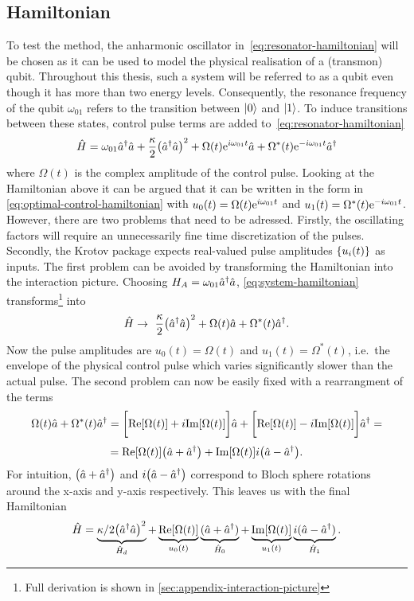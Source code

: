 \documentclass[main.tex]{subfiles}
\begin{document}
\subsection{Hamiltonian}
To test the method, the anharmonic oscillator in~\cref{eq:resonator-hamiltonian} will be chosen as it can be used to model the physical realisation of a (transmon) qubit.
Throughout this thesis, such a system will be referred to as a qubit even though it has more than two energy levels.
Consequently, the resonance frequency of the qubit \( \omega_{01} \) refers to the transition between \( \ket{0} \) and \( \ket{1} \).
To induce transitions between these states, control pulse terms are added to~\cref{eq:resonator-hamiltonian}
\begin{equation}
    \hat{H} = \omega_{01} \hat{a}^\dagger\hat{a} + \frac{\kappa}{2} \qty(\hat{a}^\dagger\hat{a})^2 + \Omega(t)\mathrm{e}^{i\omega_{01}t}\hat{a} + \Omega^*(t)\mathrm{e}^{-i\omega_{01}t}\hat{a}^\dagger
    \label{eq:system-hamiltonian}
\end{equation}
where \( \Omega(t) \) is the complex amplitude of the control pulse.
Looking at the Hamiltonian above it can be argued that it can be written in the form in \cref{eq:optimal-control-hamiltonian} with \( u_0(t) = \Omega(t)\mathrm{e}^{i\omega_{01}t} \) and \( u_1(t) = \Omega^*(t)\mathrm{e}^{-i\omega_{01}t} \).
However, there are two problems that need to be adressed.
Firstly, the oscillating factors will require an unnecessarily fine time discretization of the pulses.
Secondly, the Krotov package expects real-valued pulse amplitudes \( \qty{u_i(t)} \) as inputs.
The first problem can be avoided by transforming the Hamiltonian into the interaction picture.
Choosing \( H_A = \omega_{01} \hat{a}^\dagger\hat{a} \), \cref{eq:system-hamiltonian} transforms\footnote{Full derivation is shown in \cref{sec:appendix-interaction-picture}} into
\begin{equation}
    \hat{H} \rightarrow~ \frac{\kappa}{2}\qty(\hat{a}^\dagger\hat{a})^2 + \Omega(t)\hat{a} + \Omega^*(t)\hat{a}^\dagger.
\end{equation}
Now the pulse amplitudes are \( u_0(t) = \Omega(t) \) and \( u_1(t) = \Omega^*(t) \), i.e.\ the envelope of the physical control pulse which varies significantly slower than the actual pulse.
The second problem can now be easily fixed with a rearrangment of the terms
\[ \Omega(t)\hat{a} + \Omega^*(t)\hat{a}^\dagger = \bigg[\text{Re}\qty[\Omega(t)]+i\text{Im}\qty[\Omega(t)]\bigg]\hat{a} + \bigg[\text{Re}\qty[\Omega(t)]-i\text{Im}\qty[\Omega(t)]\bigg]\hat{a}^\dagger = \]
\[ = \text{Re}\qty[\Omega(t)]\qty(\hat{a} + \hat{a}^\dagger) + \text{Im}\qty[\Omega(t)]i\qty(\hat{a} - \hat{a}^\dagger). \]
For intuition, \( \qty(\hat{a} + \hat{a}^\dagger) \) and \( i\qty(\hat{a} - \hat{a}^\dagger) \) correspond to Bloch sphere rotations around the x-axis and y-axis respectively. 
This leaves us with the final Hamiltonian
\begin{equation}
    \hat{H} = \underbrace{\kappa/2\qty(\hat{a}^\dagger\hat{a})^2}_{\hat{H}_d} + \underbrace{\text{Re}\qty[\Omega(t)]}_{u_0(t)}\underbrace{(\hat{a} + \hat{a}^\dagger)}_{\hat{H}_0} + \underbrace{\text{Im}\qty[\Omega(t)]}_{u_1(t)}\underbrace{i(\hat{a} - \hat{a}^\dagger)}_{\hat{H}_1} .
    \label{eq:system-hamiltonian-rotating}
\end{equation}
\end{document}
